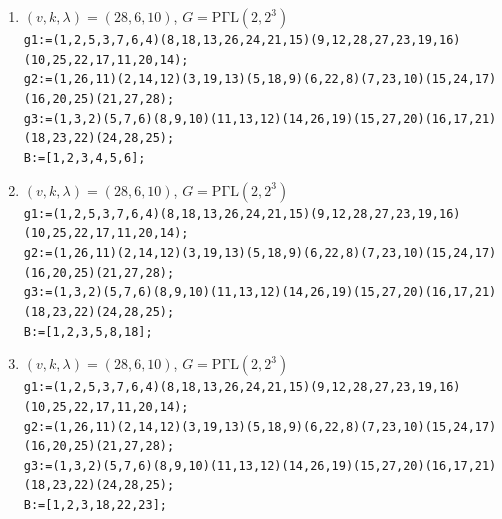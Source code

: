 \documentclass[a4paper,twopage,reqno,12pt]{amsart}
\theoremstyle{definition}
\numberwithin{equation}{section}
\newcommand{\PGaL}{\mathrm{P\Gamma L}}
\newcommand{\Aut}{\mathrm{Aut}}
\begin{document}
\begin{enumerate}
\item\label{28610_2} $(v,k,\lambda)=(28,6,10)$, $G=\PGaL(2,2^3)$\\
    {\scriptsize \texttt{g1:=(1,2,5,3,7,6,4)(8,18,13,26,24,21,15)(9,12,28,27,23,19,16)(10,25,22,17,11,20,14);}\\
    \texttt{g2:=(1,26,11)(2,14,12)(3,19,13)(5,18,9)(6,22,8)(7,23,10)(15,24,17)(16,20,25)(21,27,28);}\\
    \texttt{g3:=(1,3,2)(5,7,6)(8,9,10)(11,13,12)(14,26,19)(15,27,20)(16,17,21)(18,23,22)(24,28,25);}}\\
    \texttt{B:=[1,2,3,4,5,6];}\\

\item\label{28610_3} $(v,k,\lambda)=(28,6,10)$, $G=\PGaL(2,2^3)$\\
    {\scriptsize \texttt{g1:=(1,2,5,3,7,6,4)(8,18,13,26,24,21,15)(9,12,28,27,23,19,16)(10,25,22,17,11,20,14);}\\
    \texttt{g2:=(1,26,11)(2,14,12)(3,19,13)(5,18,9)(6,22,8)(7,23,10)(15,24,17)(16,20,25)(21,27,28);}\\
    \texttt{g3:=(1,3,2)(5,7,6)(8,9,10)(11,13,12)(14,26,19)(15,27,20)(16,17,21)(18,23,22)(24,28,25);}}\\
    \texttt{B:=[1,2,3,5,8,18];}\\

\item\label{28610_4} $(v,k,\lambda)=(28,6,10)$, $G=\PGaL(2,2^3)$\\
    {\scriptsize \texttt{g1:=(1,2,5,3,7,6,4)(8,18,13,26,24,21,15)(9,12,28,27,23,19,16)(10,25,22,17,11,20,14);}\\
    \texttt{g2:=(1,26,11)(2,14,12)(3,19,13)(5,18,9)(6,22,8)(7,23,10)(15,24,17)(16,20,25)(21,27,28);}\\
    \texttt{g3:=(1,3,2)(5,7,6)(8,9,10)(11,13,12)(14,26,19)(15,27,20)(16,17,21)(18,23,22)(24,28,25);}}\\
    \texttt{B:=[1,2,3,18,22,23];}\\


\end{enumerate}
\end{document}
